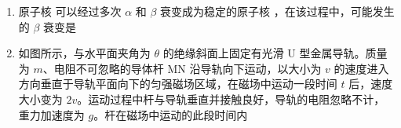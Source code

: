 \documentclass[\gkver]{gaokaozhenti}
\begin{document}
\begin{enumerate}
{B．设水中的入射角为 $i$、空气中的折射角为 $r$，由折射定律得
$n=\frac{\sin r}{\sin i}$

a、b 光以相同的入射角由水斜射入空气，a 光的折射角比 b 光的大，则
$n_{a}>n_{b}$

根据光在介质中的传播速度与折射率的关系
$n=\frac{c}{v}$

可得在水中传播时，a 光的速度比 b 光的小，故 B 错误；

C．由空气中的波长 $\lambda_a<\lambda_b$ 及 $f=c/\lambda$ 知，a 光的频率较大；光进入水中时频率不变，故 C 错误；

D．根据临界角与折射率的关系
$n=\frac{1}{\sin C}$

可得在水中传播时，a 光的折射率比 b 光的大，a 光的全反射临界角比 b 光的小，故 D 正确。

故选 D。
}

\item
原子核  可以经过多次 $\alpha$ 和 $\beta$ 衰变成为稳定的原子核 ，在该过程中，可能发生的 $\beta$ 衰变是

{}
{}
{}


\item
如图所示，与水平面夹角为 $\theta$ 的绝缘斜面上固定有光滑 U 型金属导轨。质量为 $m$、电阻不可忽略的导体杆 MN 沿导轨向下运动，以大小为 $v$ 的速度进入方向垂直于导轨平面向下的匀强磁场区域，在磁场中运动一段时间 $t$ 后，速度大小变为 $2v$。运动过程中杆与导轨垂直并接触良好，导轨的电阻忽略不计，重力加速度为 $g$。杆在磁场中运动的此段时间内


\end{enumerate}
\end{document}

